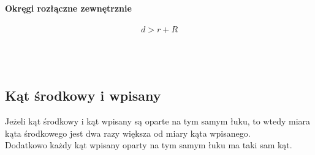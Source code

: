 \documentclass[14pt,a4paper]{extarticle}
\begin{document}
\hfill\break
\noindent \textbf{Okręgi rozłączne zewnętrznie}
\hfill\break\\\\
$$d > r + R$$
\hfill\break\\\\\\
\MoveBelowBox\unskip

\newpage

\subsection{Kąt środkowy i wpisany}
\hfill\break
\noindent Jeżeli kąt środkowy i kąt wpisany są oparte na tym samym łuku, to wtedy miara kąta
środkowego jest dwa razy większa od miary kąta wpisanego.\\ Dodatkowo każdy kąt wpisany oparty
na tym samym łuku ma taki sam kąt.
\end{document}
